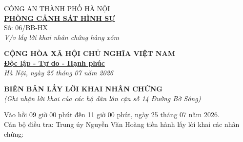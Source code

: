 \documentclass[12pt,a4paper]{article}
\begin{document}
\noindent
\begin{minipage}[t]{0.45\textwidth}
    \begin{center}
        \small
        CÔNG AN THÀNH PHỐ HÀ NỘI\\
        \textbf{\underline{PHÒNG CẢNH SÁT HÌNH SỰ}}\\[0.1cm]
        Số: 06/BB-HX\\
        \textit{V/v lấy lời khai nhân chứng hàng xóm}
    \end{center}
\end{minipage}
\hfill
\begin{minipage}[t]{0.52\textwidth}
    \begin{center}
        \small
        \textbf{CỘNG HÒA XÃ HỘI CHỦ NGHĨA VIỆT NAM}\\
        \textbf{\underline{Độc lập - Tự do - Hạnh phúc}}\\[0.1cm]
        \textit{Hà Nội, ngày 25 tháng 07 năm 2026}
    \end{center}
\end{minipage}

\vspace{0.6cm}

\begin{center}
    \textbf{\large BIÊN BẢN LẤY LỜI KHAI NHÂN CHỨNG}\\
    \textit{(Ghi nhận lời khai của các hộ dân lân cận số 14 Đường Bờ Sông)}
\end{center}

\vspace{0.3cm}

\noindent Vào hồi 09 giờ 00 phút đến 11 giờ 00 phút, ngày 25 tháng 07 năm 2026.\\
Cán bộ điều tra: Trung úy Nguyễn Văn Hoàng tiến hành lấy lời khai các nhân chứng:
\end{document}
